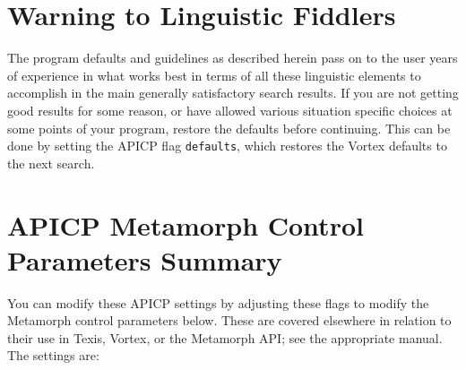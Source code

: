 \section{Warning to Linguistic Fiddlers}

The program defaults and guidelines as described herein pass on to the
user years of experience in what works best in terms of all these
linguistic elements to accomplish in the main generally satisfactory
search results.  If you are not getting good results for some reason,
or have allowed various situation specific choices at some points of
your program, restore the defaults before continuing. This can be done
by setting the APICP flag \verb`defaults`, which restores the
Vortex defaults to the next search.

\section{APICP Metamorph Control Parameters Summary}

You can modify these APICP settings by adjusting these flags to modify
the Metamorph control parameters below.  These are covered elsewhere
in relation to their use in Texis, Vortex, or the Metamorph API; see
the appropriate manual.  The settings are:

